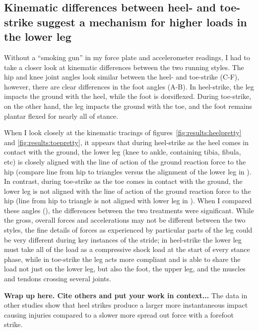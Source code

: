 \subsection{Kinematic differences between heel- and toe-strike suggest a mechanism for higher loads in the lower leg}

Without a ``smoking gun'' in my force plate and accelerometer readings, I had to take a closer look at kinematic differences between the two running styles. The hip and knee joint angles look similar between the heel- and toe-strike (C-F), however, there are clear differences in the foot angles (A-B). In heel-strike, the leg impacts the ground with the heel, while the foot is dorsiflexed. During toe-strike, on the other hand, the leg impacts the ground with the toe, and the foot remains plantar flexed for nearly all of stance.

When I look closely at the kinematic tracings of figures~\ref{fig:results:heelpretty} and \ref{fig:results:toepretty}, it appears that during heel-strike as the heel comes in contact with the ground, the lower leg (knee to ankle, containing tibia, fibula, etc) is closely aligned with the line of action of the ground reaction force to the hip (compare line from hip to triangles versus the alignment of the lower leg in ). In contrast, during toe-strike as the toe comes in contact with the ground, the lower leg is not aligned with the line of action of the ground reaction force to the hip (line from hip to triangle is not aligned with lower leg in ). When I compared these angles (), the differences between the two treatments were significant. While the gross, overall forces and accelerations may not be different between the two styles, the fine details of forces as experienced by particular parts of the leg could be very different during key instances of the stride; in heel-strike the lower leg must take all of the load as a compressive shock load at the start of every stance phase, while in toe-strike the leg acts more compliant and is able to share the load not just on the lower leg, but also the foot, the upper leg, and the muscles and tendons crossing several joints. 

\textbf{Wrap up here. Cite others and put your work in context...} The data in other studies show that heel strikes produce a larger more instantaneous impact causing injuries compared to a slower more spread out force with a forefoot strike. 

